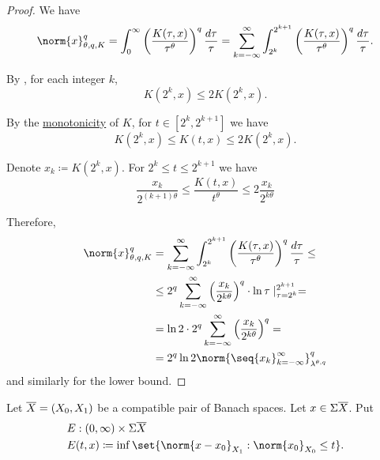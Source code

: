 \begin{proof}
  We have
  \begin{equation*}
    \norm{x}_{\theta,q,K}^q
    =
    \int_0^\infty \left( \frac {K(\tau, x)} {\tau^\theta} \right)^q \frac {d\tau} \tau
    =
    \sum_{k=-\infty}^\infty \int_{2^k}^{2^{k+1}} \left( \frac {K(\tau, x)} {\tau^\theta} \right)^q \frac {d\tau} \tau.
  \end{equation*}

  By , for each integer \( k \),
  \begin{equation*}
    K(2^k, x) \leq 2 K(2^k, x).
  \end{equation*}

  By the \hyperref[def:k_functional_properties/basic]{monotonicity} of \( K \), for \( t \in [2^k, 2^{k+1}] \) we have
  \begin{equation*}
    K(2^k, x) \leq K(t, x) \leq 2 K(2^k, x).
  \end{equation*}

  Denote \( x_k \coloneqq K(2^k, x) \). For \( 2^k \leq t \leq 2^{k+1} \) we have
  \begin{equation*}
    \frac{x_k}{2^{(k+1)\theta}} \leq \frac{K(t, x)}{t^\theta} \leq 2 \frac{x_k}{2^{k\theta}}
  \end{equation*}

  Therefore,
  \begin{align*}
    \norm{x}_{\theta,q,K}^q
    &=
    \sum_{k=-\infty}^\infty \int_{2^k}^{2^{k+1}} \left( \frac {K(\tau, x)} {\tau^\theta} \right)^q \frac {d\tau} \tau
    \leq \\ &\leq
    2^q \sum_{k=-\infty}^\infty \left(\frac{x_k}{2^{k\theta}} \right)^q \cdot \ln \tau \mid_{\tau=2^k}^{2^{k+1}}
    = \\ &=
    \ln 2 \cdot 2^q \sum_{k=-\infty}^\infty \left(\frac{x_k}{2^{k\theta}} \right)^q
    = \\ &=
    2^q \ln 2 \norm{\seq{ x_k }_{k=-\infty}^\infty}_{\lambda^{\theta,q}}^q
  \end{align*}
  and similarly for the lower bound.
\end{proof}

\begin{definition}\label{def:e_functional}
  Let \( \oline{X} = (X_0, X_1) \) be a compatible pair of Banach spaces. Let \( x \in \Sigma \oline{X} \). Put
  \begin{equation}\label{eq:def:e_functional}
    \begin{aligned}
      &E: (0, \infty) \times {\Sigma \oline{X}} \\
      &E(t, x) \coloneqq \inf \set{ \norm{x - x_0}_{X_1} : \norm{x_0}_{X_0} \leq t }.
    \end{aligned}
  \end{equation}
\end{definition}


